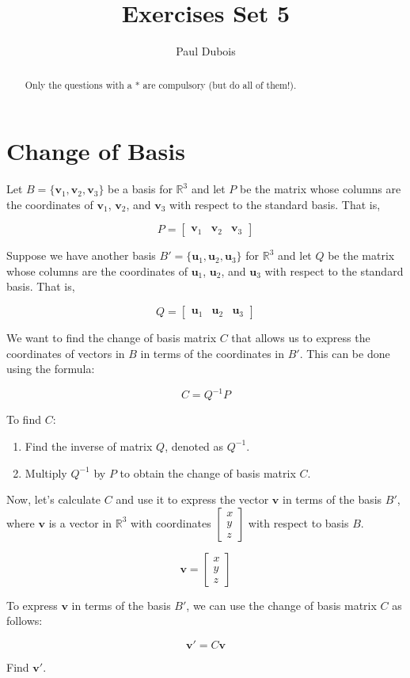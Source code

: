 \documentclass[]{article}
\title{Exercises Set 5}
\author{Paul Dubois}
\begin{document}
	
	\maketitle
	
	\begin{abstract}
		Only the questions with a * are compulsory (but do all of them!).
	\end{abstract}	
	
	\section{Change of Basis}

	Let $B = \{ \mathbf{v}_1, \mathbf{v}_2, \mathbf{v}_3 \}$ be a basis for $\mathbb{R}^3$ and let $P$ be the matrix whose columns are the coordinates of $\mathbf{v}_1$, $\mathbf{v}_2$, and $\mathbf{v}_3$ with respect to the standard basis. That is,

	\[
	P = \begin{bmatrix}
		\mathbf{v}_1 & \mathbf{v}_2 & \mathbf{v}_3
	\end{bmatrix}
	\]

	Suppose we have another basis $B' = \{ \mathbf{u}_1, \mathbf{u}_2, \mathbf{u}_3 \}$ for $\mathbb{R}^3$ and let $Q$ be the matrix whose columns are the coordinates of $\mathbf{u}_1$, $\mathbf{u}_2$, and $\mathbf{u}_3$ with respect to the standard basis. That is,

	\[
	Q = \begin{bmatrix}
		\mathbf{u}_1 & \mathbf{u}_2 & \mathbf{u}_3
	\end{bmatrix}
	\]

	We want to find the change of basis matrix $C$ that allows us to express the coordinates of vectors in $B$ in terms of the coordinates in $B'$. This can be done using the formula:

	\[
	C = Q^{-1}P
	\]

	To find $C$:

	\begin{enumerate}
		\item Find the inverse of matrix $Q$, denoted as $Q^{-1}$.
		\item Multiply $Q^{-1}$ by $P$ to obtain the change of basis matrix $C$.
	\end{enumerate}

	Now, let's calculate $C$ and use it to express the vector $\mathbf{v}$ in terms of the basis $B'$, where $\mathbf{v}$ is a vector in $\mathbb{R}^3$ with coordinates $\begin{bmatrix} x \\ y \\ z \end{bmatrix}$ with respect to basis $B$.

	\[
	\mathbf{v} = \begin{bmatrix}
		x \\
		y \\
		z
	\end{bmatrix}
	\]

	To express $\mathbf{v}$ in terms of the basis $B'$, we can use the change of basis matrix $C$ as follows:

	\[
	\mathbf{v'} = C\mathbf{v}
	\]

	Find $\mathbf{v'}$.
\end{document}
